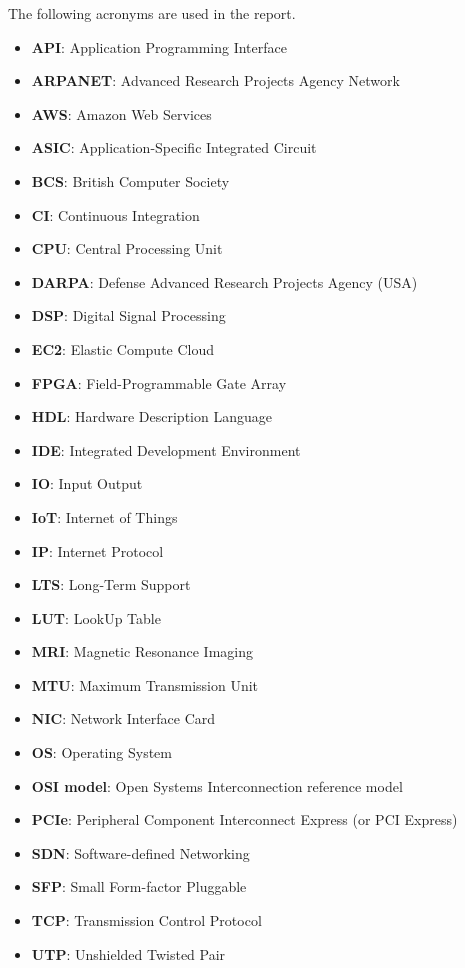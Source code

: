 The following acronyms are used in the report.
\begin{itemize}
  \item \textbf{API}: Application Programming Interface
  \item \textbf{ARPANET}: Advanced Research Projects Agency Network
  \item \textbf{AWS}: Amazon Web Services
  \item \textbf{ASIC}: Application-Specific Integrated Circuit
  \item \textbf{BCS}: British Computer Society
  \item \textbf{CI}: Continuous Integration
  \item \textbf{CPU}: Central Processing Unit
  \item \textbf{DARPA}: Defense Advanced Research Projects Agency (USA)
  \item \textbf{DSP}: Digital Signal Processing
  \item \textbf{EC2}: Elastic Compute Cloud
  \item \textbf{FPGA}: Field-Programmable Gate Array
  \item \textbf{HDL}: Hardware Description Language
  \item \textbf{IDE}: Integrated Development Environment
  \item \textbf{IO}: Input Output
  \item \textbf{IoT}: Internet of Things
  \item \textbf{IP}: Internet Protocol
  \item \textbf{LTS}: Long-Term Support
  \item \textbf{LUT}: LookUp Table
  \item \textbf{MRI}: Magnetic Resonance Imaging
  \item \textbf{MTU}: Maximum Transmission Unit
  \item \textbf{NIC}: Network Interface Card
  \item \textbf{OS}: Operating System
  \item \textbf{OSI model}: Open Systems Interconnection reference model
  \item \textbf{PCIe}: Peripheral Component Interconnect Express (or PCI Express)
  \item \textbf{SDN}: Software-defined Networking
  \item \textbf{SFP}: Small Form-factor Pluggable
  \item \textbf{TCP}: Transmission Control Protocol
  \item \textbf{UTP}: Unshielded Twisted Pair
\end{itemize}
